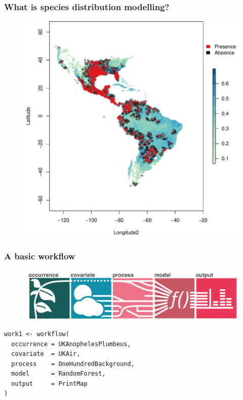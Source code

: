 \documentclass{beamer}
\begin{document}
\begin{frame}
\frametitle{What is species distribution modelling?}
\begin{figure}
    \includegraphics[height = 0.8\textheight]{fengChangeWorkflow-1.pdf}
\end{figure} 
\end{frame} 


\begin{frame}[fragile]
\frametitle{A basic workflow}
\begin{figure}
    \includegraphics[width = \textwidth]{diagrams}
\end{figure} 
\begin{Verbatim}
work1 <- workflow(
  occurrence = UKAnophelesPlumbeus,
  covariate  = UKAir,
  process    = OneHundredBackground,
  model      = RandomForest,
  output     = PrintMap
)

\end{Verbatim}

\end{frame} 
\end{document}
